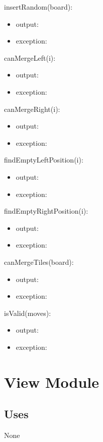\documentclass[12pt]{article}
\begin{document}
\noindent insertRandom(board):
\begin{itemize}
\item output:
\item exception:
\end{itemize}


\noindent canMergeLeft(i):
\begin{itemize}
\item output:
\item exception:
\end{itemize}


\noindent canMergeRight(i):
\begin{itemize}
\item output:
\item exception:
\end{itemize}

\noindent findEmptyLeftPosition(i):
\begin{itemize}
\item output:
\item exception:
\end{itemize}

\noindent findEmptyRightPosition(i):
\begin{itemize}
\item output:
\item exception:
\end{itemize}

\noindent canMergeTiles(board):
\begin{itemize}
\item output:
\item exception:
\end{itemize}

\noindent isValid(moves):
\begin{itemize}
\item output:
\item exception:
\end{itemize}



\newpage

\section* {View Module}

\subsection* {Uses}

None
\end{document}
